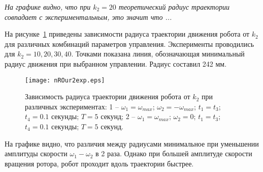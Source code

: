 \textit{На графике видно, что при $ k_2=20 $ теоретический радиус траектории совпадает с экспериментальным, это значит что ...}

На рисунке~\ref{nROur2exp} приведены зависимости радиуса траектории движения робота от $k_2$ для различных комбинаций параметров управления. Эксперименты проводились для $ k_2=10,20,30,40 $. Точками показана линия, обозначающая минимальный радиус движения при выбранном управлении. Радиус составил 242 мм.

\begin{figure}[!ht]
	\centering
	\texttt{[image: nROur2exp.eps]}
	\caption{Зависимость радиуса траектории движения робота от $k_2$ при различных экспериментах: 1 -- $\omega_1 = \omega_{max} $; $ \omega_2 = -\omega_{max} $; $ t_1=t_3 $; $ t_4=0.1 $ секунды; $ T = 5 $ секунд; 2 -- $\omega_1 = \omega_{max} $; $ \omega_2 = 0 $; $ t_1=t_3 $; $ t_4=0.1 $ секунды; $ T = 5 $ секунд.}
	\label{nROur2exp}
\end{figure}

На графике видно, что различия между радиусами минимальное при уменьшении амплитуды скорости $ \omega_1 - \omega_2 $ в 2 раза. Однако при большей амплитуде скорости вращения ротора, робот проходит вдоль траектории быстрее.


\clearpage